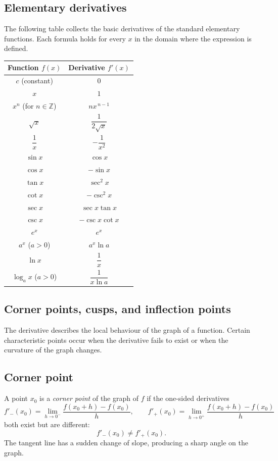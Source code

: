 \documentclass[11pt,a4paper]{article}
\theoremstyle{definition} \newtheorem{definition}{Definition} \theoremstyle{plain} \newtheorem{theorem}{Theorem}
\begin{document}
\subsection*{Elementary derivatives}
The following table collects the basic derivatives of the standard elementary functions.
Each formula holds for every $x$ in the domain where the expression is defined.
\begin{center} \renewcommand{\arraystretch}{1.4} \begin{tabular}{|c|c|} \hline \textbf{Function $f(x)$} & \textbf{Derivative $f'(x)$} \\ \hline $c$ (constant) & $0$ \\ \hline $x$ & $1$ \\ \hline $x^n$ (for $n\in\mathbb{Z}$) & $n x^{\,n-1}$ \\ \hline $\sqrt{x}$ & $\dfrac{1}{2\sqrt{x}}$ \\ \hline $\dfrac{1}{x}$ & $-\dfrac{1}{x^2}$ \\ \hline $\sin x$ & $\cos x$ \\ \hline $\cos x$ & $-\sin x$ \\ \hline $\tan x$ & $\sec^2 x$ \\ \hline $\cot x$ & $-\csc^2 x$ \\ \hline $\sec x$ & $\sec x \tan x$ \\ \hline $\csc x$ & $-\csc x \cot x$ \\ \hline $e^x$ & $e^x$ \\ \hline $a^x$ ($a>0$) & $a^x \ln a$ \\ \hline $\ln x$ & $\dfrac{1}{x}$ \\ \hline $\log_a x$ ($a>0$) & $\dfrac{1}{x \ln a}$ \\ \hline \end{tabular} \end{center}
\subsection{Corner points, cusps, and inflection points}
The derivative describes the local behaviour of the graph of a function.
Certain characteristic points occur when the derivative fails to exist or when the curvature of the graph changes.
\subsection*{Corner point}
A point $x_0$ is a \emph{corner point} of the graph of $f$ if the one-sided derivatives
\[ f'_-(x_0) = \lim_{h\to 0^-} \frac{f(x_0+h)-f(x_0)}{h}, \qquad f'_+(x_0) = \lim_{h\to 0^+} \frac{f(x_0+h)-f(x_0)}{h} \]
both exist but are different:
\[ f'_-(x_0) \neq f'_+(x_0). \]
The tangent line has a sudden change of slope, producing a sharp angle on the graph.
\end{document}
